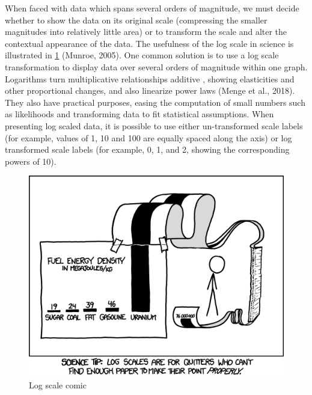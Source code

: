 \documentclass[print]{nuthesis}
\begin{document}
When faced with data which spans several orders of magnitude, we must decide whether to show the data on its original
scale (compressing the smaller magnitudes into relatively little area) or to transform the scale and alter the contextual appearance of the data.
The usefulness of the log scale in science is illustrated in \cref{fig:log-scale-comic} (Munroe, 2005).
One common solution is to use a log scale transformation to display data over several orders of magnitude within one graph.
Logarithms turn multiplicative relationships additive , showing elasticities and other proportional changes, and also linearize power laws (Menge et al., 2018).
They also have practical purposes, easing the computation of small numbers such as likelihoods and transforming data to fit statistical assumptions.
When presenting log scaled data, it is possible to use either un-transformed scale labels (for example, values of 1, 10 and 100 are equally spaced along the axis) or log transformed scale labels (for example, 0, 1, and 2, showing the corresponding powers of 10).

\begin{figure}[tbp]

{\centering \includegraphics[width=0.7\linewidth,]{images/log-scale-comic} 

}

\caption{Log scale comic}\label{fig:log-scale-comic}
\end{figure}
\end{document}

